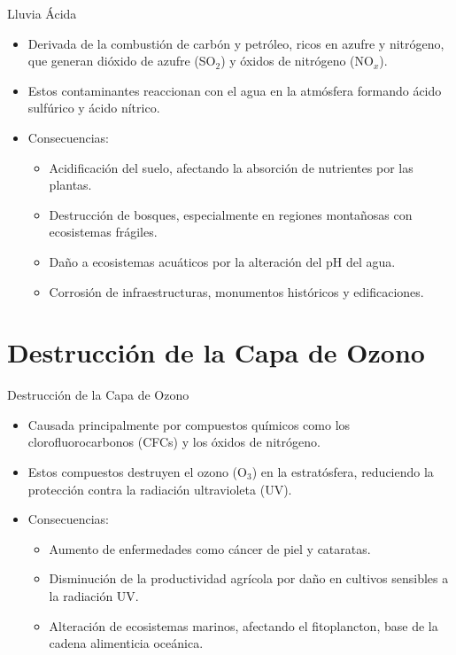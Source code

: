 \documentclass[main.tex]{subfiles}
\begin{document}
\begin{frame}{Lluvia Ácida}
    \begin{itemize}
        \item Derivada de la combustión de carbón y petróleo, ricos en azufre y nitrógeno, que generan dióxido de azufre (SO$_2$) y óxidos de nitrógeno (NO$_x$).
        \item Estos contaminantes reaccionan con el agua en la atmósfera formando ácido sulfúrico y ácido nítrico.
        \item Consecuencias:
        \begin{itemize}
            \item Acidificación del suelo, afectando la absorción de nutrientes por las plantas.
            \item Destrucción de bosques, especialmente en regiones montañosas con ecosistemas frágiles.
            \item Daño a ecosistemas acuáticos por la alteración del pH del agua.
            \item Corrosión de infraestructuras, monumentos históricos y edificaciones.
        \end{itemize}
    \end{itemize}
\end{frame}

\section{Destrucción de la Capa de Ozono}

\begin{frame}{Destrucción de la Capa de Ozono}
    \begin{itemize}
        \item Causada principalmente por compuestos químicos como los clorofluorocarbonos (CFCs) y los óxidos de nitrógeno.
        \item Estos compuestos destruyen el ozono (O$_3$) en la estratósfera, reduciendo la protección contra la radiación ultravioleta (UV).
        \item Consecuencias:
        \begin{itemize}
            \item Aumento de enfermedades como cáncer de piel y cataratas.
            \item Disminución de la productividad agrícola por daño en cultivos sensibles a la radiación UV.
            \item Alteración de ecosistemas marinos, afectando el fitoplancton, base de la cadena alimenticia oceánica.
        \end{itemize}
    \end{itemize}
\end{frame}
\end{document}
